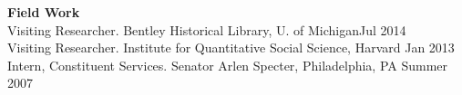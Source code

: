 \begin{minipage}{\linewidth}
\textbf{Field Work}\\
Visiting Researcher. Bentley Historical Library, U. of Michigan\hfill{Jul 2014}\smallskip\\
Visiting Researcher. Institute for Quantitative Social Science, Harvard \hfill{Jan 2013}\smallskip\\
Intern, Constituent Services. Senator Arlen Specter, Philadelphia, PA  \hfill{Summer 2007}%
\end{minipage}